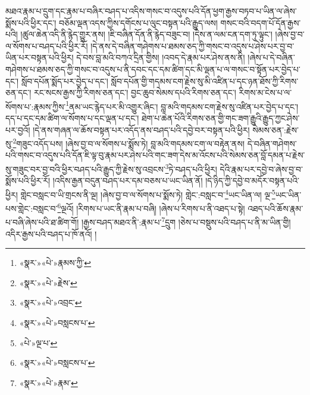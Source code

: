 མཐའ་རྣམ་པ་དྲུག་དང་རྣམ་པ་བཞིར་བཤད་པ་འདིས་གསང་བ་འདུས་པའི་དོན་ཕྱག་རྒྱས་བཏབ་པ་ཡིན་ལ་ཞེས་སྨོས་པའི་ཕྱིར་དང་། བཅོམ་ལྡན་འདས་ཀྱིས་དགོངས་པ་ལུང་བསྟན་པའི་རྒྱུད་ལས། གསང་བའི་བདག་པོ་དོན་རྒྱས་པའི། །ཚུལ་ཆེན་འདི་ནི་རྙེད་གྱུར་ནས། །ཇི་བཞིན་དོན་ནི་རྙེད་བཟུང་བ། །དེས་ན་ལམ་ངན་དག་ཏུ་ལྟུང་། །ཞེས་བྱ་བ་ལ་སོགས་པ་བཤད་པའི་ཕྱིར་རོ། །དེ་ནས་དེ་བཞིན་གཤེགས་པ་ཐམས་ཅད་ཀྱི་གསང་བ་འདུས་པ་ཤེས་པར་བྱ་བ་ཡིན་པར་བསྟན་པའི་ཕྱིར། དེ་བས་བླ་མའི་བཀའ་དྲིན་གྱིས། །འབད་དེ་རྣམ་པར་ཤེས་ནས་ནི། །ཞེས་པ་དེ་བཞིན་གཤེགས་པ་ཐམས་ཅད་ཀྱི་གསང་བ་འདུས་པ་ནི་དབང་དང་དམ་ཚིག་དང་མི་ལྡན་པ་ལ་གསང་བ་སྟོན་པར་བྱེད་པ་དང་། སློབ་དཔོན་སྨོད་པར་བྱེད་པ་དང་། སློབ་དཔོན་གྱི་གདམས་ངག་རྗེས་སུ་མི་འཛིན་པ་དང་ཉན་ཐོས་ཀྱི་རིགས་ཅན་དང་། རང་སངས་རྒྱས་ཀྱི་རིགས་ཅན་དང་། བྱང་ཆུབ་སེམས་དཔའི་རིགས་ཅན་དང་། རིགས་མ་ངེས་པ་ལ་སོགས་པ་:རྣམས་ཀྱིས་\footnote{«སྣར་»«པེ་»རྣམས་ཀྱི་}ནམ་ཡང་རྙེད་པར་མི་འགྱུར་ཞིང་། བླ་མའི་གདམས་ངག་རྗེས་སུ་འཛིན་པར་བྱེད་པ་དང་། དད་པ་དང་དམ་ཚིག་ལ་སོགས་པ་དང་ལྡན་པ་དང་། ཐེག་པ་ཆེན་པོའི་རིགས་ཅན་གྱི་གང་ཟག་རྒྱུའི་རྒྱུད་ཀྱང་ཤེས་པར་བྱའོ། །དེ་ནས་གཞན་ལ་ཆོས་བསྟན་པར་འདོད་ནས་བཤད་པའི་དབྱེ་བར་བསྟན་པའི་ཕྱིར། སེམས་ཅན་:རྗེས་སུ་\footnote{«སྣར་»«པེ་»རྗེས་}གཟུང་འདོད་པས། །ཞེས་བྱ་བ་ལ་སོགས་པ་སྨོས་ཏེ། བླ་མའི་གདམས་ངག་ལ་བརྟེན་ནས། དེ་བཞིན་གཤེགས་པའི་གསང་བ་འདུས་པའི་དོན་ཇི་ལྟ་བུ་རྣམ་པར་ཤེས་པའི་གང་ཟག་དེས་མ་འོངས་པའི་སེམས་ཅན་བློ་དམན་པ་རྗེས་སུ་གཟུང་བར་བྱ་བའི་ཕྱིར་བཤད་པའི་རྒྱུད་ཀྱི་རྗེས་སུ་འབྲངས་\footnote{«སྣར་»«པེ་»འབྲང་}ཏེ་བཤད་པའི་ཕྱིར། དེའི་རྣམ་པར་དབྱེ་བ་ཞེས་བྱ་བ་སྨོས་པའི་ཕྱིར་རོ། །འདིས་རྒྱན་བདུན་བཤད་པར་དམ་བཅས་པ་ཡང་ཡིན་ནོ། །དེ་ཉིད་ཀྱི་དབྱེ་བ་མདོར་བསྟན་པའི་ཕྱིར། གླེང་བསླང་བ་ཡི་གྲངས་ནི་ལྔ། །ཞེས་བྱ་བ་ལ་སོགས་པ་སྨོས་ཏེ། གླེང་:བསླང་བ་\footnote{«སྣར་»«པེ་»བསླངས་པ་}ཡང་ཡིན་ལ། ལྔ་\footnote{«པེ་»ལྔ་པ་}ཡང་ཡིན་པས་གླེང་:བསླང་བ་\footnote{«སྣར་»«པེ་»བསླངས་པ་}ལྔའོ། །རིགས་པ་ཡང་ནི་རྣམ་པ་བཞི། །ཞེས་པ་རིགས་པ་ནི་འཐད་པ་སྟེ། འཐད་པའི་ཆོས་རྣམ་པ་བཞི་ཞེས་པའི་ཐ་ཚིག་གོ། །རྒྱས་བཤད་མཐའ་ནི་:རྣམ་པ་\footnote{«སྣར་»«པེ་»རྣམ་}དྲུག །ཅེས་པ་བསྡུས་པའི་བཤད་པ་ནི་མ་ཡིན་གྱི། འདིར་རྒྱས་པའི་བཤད་པ་ཁོ་ནའོ། །
